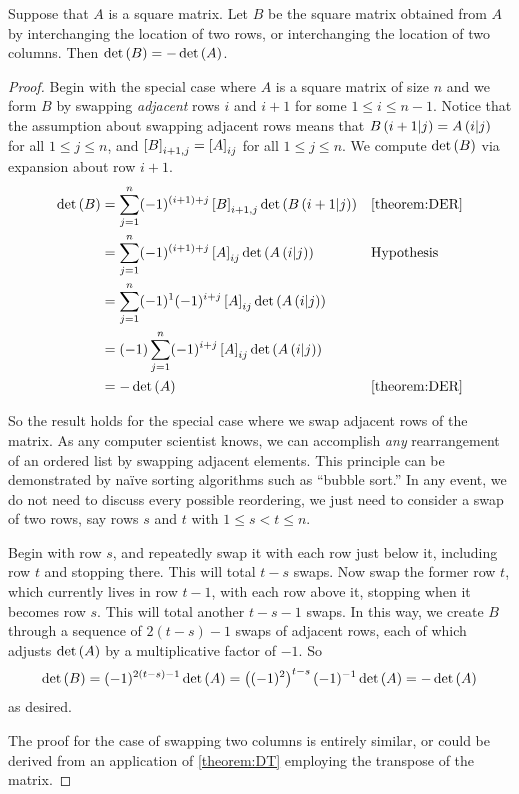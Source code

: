 \documentclass{ximera}
\begin{document}
\begin{theorem}
\label{theorem:DRCS}

Suppose that $A$ is a square matrix.  Let $B$ be the square matrix
obtained from $A$ by interchanging the location of two rows, or
interchanging the location of two columns.  Then
$\det\left(B\right)=-\det\left(A\right)$.

  \begin{proof}
    Begin with the special case where $A$ is a square matrix of size
    $n$ and we form $B$ by swapping \textit{adjacent} rows $i$ and
    $i+1$ for some $1\leq i\leq n-1$.  Notice that the assumption
    about swapping adjacent rows means that
    $B\left(i+1|j\right)=A\left(i|j\right)$ for all
    $1\leq j\leq n$, and $\left\lbrack B\right\rbrack_{i+1,j}=\left\lbrack A\right\rbrack_{ij}$
    for all $1\leq j\leq n$.  We compute $\det\left(B\right)$ via expansion
    about row $i+1$.
    \begin{align*}
      \det\left(B\right)
      &=
        \sum_{j=1}^{n}(-1)^{(i+1)+j}\left\lbrack B\right\rbrack_{i+1,j}\det\left(B\left(i+1|j\right)\right)
      &&\ref{theorem:DER}\\
      &=
        \sum_{j=1}^{n}(-1)^{(i+1)+j}\left\lbrack A\right\rbrack_{ij}\det\left(A\left(i|j\right)\right)
      &&\text{Hypothesis}\\
      &=
        \sum_{j=1}^{n}(-1)^{1}(-1)^{i+j}\left\lbrack A\right\rbrack_{ij}\det\left(A\left(i|j\right)\right)\\
      &=
        (-1)\sum_{j=1}^{n}(-1)^{i+j}\left\lbrack A\right\rbrack_{ij}\det\left(A\left(i|j\right)\right)\\
      &=
        -\det\left(A\right)&&\ref{theorem:DER}
    \end{align*}

    So the result holds for the special case where we swap adjacent
    rows of the matrix.  As any computer scientist knows, we can
    accomplish \textit{any} rearrangement of an ordered list by
    swapping adjacent elements.  This principle can be demonstrated by
    na\"ive sorting algorithms such as ``bubble sort.''  In any event,
    we do not need to discuss every possible reordering, we just need
    to consider a swap of two rows, say rows $s$ and $t$ with
    $1\leq s<t\leq n$.

    Begin with row $s$, and repeatedly swap it with each row just
    below it, including row $t$ and stopping there.  This will total
    $t-s$ swaps.  Now swap the former row $t$, which currently lives
    in row $t-1$, with each row above it, stopping when it becomes row
    $s$.  This will total another $t-s-1$ swaps.  In this way, we
    create $B$ through a sequence of $2(t-s)-1$ swaps of adjacent
    rows, each of which adjusts $\det\left(A\right)$ by a multiplicative
    factor of $-1$.  So
    \[
      \det\left(B\right)
      =
      (-1)^{2(t-s)-1}\det\left(A\right)
      =
      \left((-1)^2\right)^{t-s}(-1)^{-1}\det\left(A\right)
      =
      -\det\left(A\right)
    \]
    as desired.

    The proof for the case of swapping two columns is entirely
    similar, or could be derived from an application of
    \ref{theorem:DT} employing the transpose of the matrix.
  \end{proof}
\end{theorem}
\end{document}
